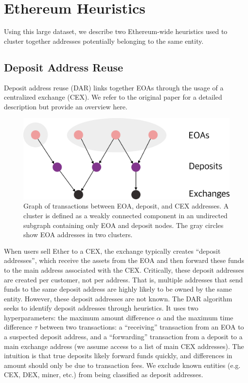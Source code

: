 \section{Ethereum Heuristics} 
\label{sec:eth}

Using this large dataset, we describe two Ethereum-wide heuristics used to cluster together addresses potentially belonging to the same entity.

\subsection{Deposit Address Reuse}
\label{sec:dar}

Deposit address reuse (DAR) links together EOAs through the usage of a centralized exchange (CEX). We refer to the original paper \citep{victor2020address} for a detailed description but provide an overview here.

\begin{figure}[b!]
\includegraphics[width=\linewidth]{figures/dar.pdf}
\caption{Graph of transactions between EOA, deposit, and CEX addresses. A cluster is defined as a weakly connected component in an undirected subgraph containing only EOA and deposit nodes. The gray circles show EOA addresses in two clusters.}
\label{fig:dar}
\end{figure}

When users sell Ether to a CEX, the exchange typically creates ``deposit addresses'', which receive the assets from the EOA and then forward these funds to the main address associated with the CEX. Critically, these deposit addresses are created per customer, not per address. That is, multiple addresses that send funds to the same deposit address are highly likely to be owned by the same entity. However, these deposit addresses are not known. The DAR algorithm seeks to identify deposit addresses through heuristics.
It uses two hyperparameters: the maximum amount difference $\alpha$ and the maximum time difference $\tau$ between two transactions: a ``receiving'' transaction from an EOA to a suspected deposit address, and a ``forwarding'' transaction from a deposit to a main exchange address (we assume access to a list of main CEX addresses). The intuition is that true deposits likely forward funds quickly, and differences in amount should only be due to transaction fees. We exclude known entities (e.g. CEX, DEX, miner, etc.) from being classified as deposit addresses.

